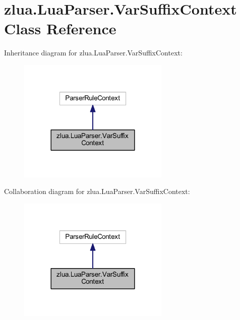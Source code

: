 \hypertarget{classzlua_1_1_lua_parser_1_1_var_suffix_context}{}\section{zlua.\+Lua\+Parser.\+Var\+Suffix\+Context Class Reference}
\label{classzlua_1_1_lua_parser_1_1_var_suffix_context}


Inheritance diagram for zlua.\+Lua\+Parser.\+Var\+Suffix\+Context\+:
\nopagebreak
\begin{figure}[H]
\begin{center}
\leavevmode
\includegraphics[width=204pt]{classzlua_1_1_lua_parser_1_1_var_suffix_context__inherit__graph}
\end{center}
\end{figure}


Collaboration diagram for zlua.\+Lua\+Parser.\+Var\+Suffix\+Context\+:
\nopagebreak
\begin{figure}[H]
\begin{center}
\leavevmode
\includegraphics[width=204pt]{classzlua_1_1_lua_parser_1_1_var_suffix_context__coll__graph}
\end{center}
\end{figure}
